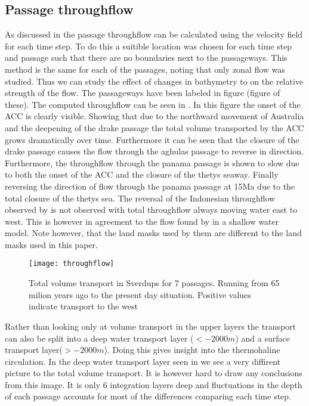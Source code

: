 \subsection{Passage throughflow}
As discussed in  the passage throughflow can be calculated using the velocity field for each time step. To do this a suitible location was chosen for each time step and passage such that there are no boundaries next to the passageways. This method is the same for each of the passages, noting that only zonal flow was studied. Thus we can study the effect of changes in bathymetry to on the relative strength of the flow.  The passageways have been labeled in figure (figure of these). The computed throughflow can be seen in . In this figure the onset of the ACC is clearly visible. Showing that due to the northward movement of Australia and the deepening of the drake passage the total volume transported by the ACC grows dramatically over time. Furthermore it can be seen that the closure of the drake passage causes the flow through the aghulas passage to reverse in direction. Furthermore, the throughflow through the panama passage is shown to slow due to both the onset of the ACC and the closure of the thetys seaway. Finally reversing the direction of flow through the panama passage at 15Ma due to the total closure of the thetys sea. The reversal of the Indonesian throughflow observed by \cite{Mulder2017Jul} is not observed with total throughflow always moving water east to west. This is however in agreement to the flow found by \cite{omta2003physical} in a shallow water model. Note however, that the land masks used by them are different to the land masks used in this paper.

\begin{figure}[H]
	\texttt{[image: throughflow]}
	\caption{Total volume transport in Sverdups for 7 passages. Running from 65 milion years ago to the present day situation. Positive values indicate transport to the west}
	\label{fig:throughflow}
\end{figure}

Rather than looking only at volume transport in the upper layers the transport can also be split into a deep water transport layer ($<-2000m$) and a surface transport layer($>-2000m$). Doing this gives insight into the thermohaline circulation. In the deep water transport layer seen in  we see a very diffirent picture to the total volume transport. It is however hard to draw any conclusions from this image. It is only 6 integration layers deep and fluctuations in the depth of each passage accounts for most of the differences comparing each time step.

